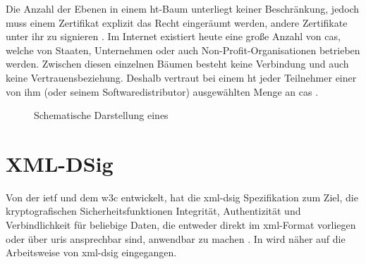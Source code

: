 Die Anzahl der Ebenen in einem \gls{ht}-Baum unterliegt keiner Beschränkung, jedoch muss einem Zertifikat explizit das Recht eingeräumt werden, andere
Zertifikate unter ihr zu signieren \cite{kits}. Im Internet existiert heute eine große Anzahl von \glspl{ca}, welche von Staaten, Unternehmen oder auch
Non-Profit-Organisationen betrieben werden. Zwischen diesen einzelnen Bäumen besteht keine Verbindung und auch keine Vertrauensbeziehung. Deshalb vertraut bei
einem \gls{ht} jeder Teilnehmer einer von ihm (oder seinem Softwaredistributor) ausgewählten Menge an \glspl{ca} \cite{ssliverse:eff,krypto-pki-internet}.

\begin{figure}
\centering

\caption{Schematische Darstellung eines \texorpdfstring{\protect{}}{HT}}
\label{fig:cot}
\end{figure}

\section{XML-DSig}
\label{sec:GrundlagenDefinitionen:xml-dsig}
Von der \gls{ietf} und dem \gls{w3c} entwickelt, hat die \gls{xml-dsig} Spezifikation zum Ziel, die kryptografischen Sicherheitsfunktionen Integrität,
Authentizität und Verbindlichkeit für beliebige Daten, die entweder direkt im \gls{xml}-Format vorliegen oder über \glspl{uri} ansprechbar sind, anwendbar zu
machen \cite{krypto-pki-internet}. In  wird näher auf die Arbeitsweise von \gls{xml-dsig} eingegangen.

